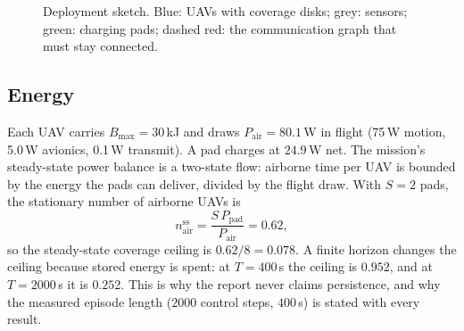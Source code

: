 \documentclass[conference]{IEEEtran}
\begin{document}
\begin{figure}[t]
\centering
{}
\caption{Deployment sketch. Blue: UAVs with coverage disks; grey: sensors; green: charging pads; dashed red: the communication graph that must stay connected.}
\label{fig:setup}
\end{figure}

\subsection{Energy}
Each UAV carries $B_{\max}=30$\,kJ and draws $P_{\mathrm{air}}=80.1$\,W in flight (75\,W motion, 5.0\,W avionics, 0.1\,W transmit). A pad charges at $24.9$\,W net. The mission's steady-state power balance is a two-state flow: airborne time per UAV is bounded by the energy the pads can deliver, divided by the flight draw. With $S=2$ pads, the stationary number of airborne UAVs is
\begin{equation}
n_{\mathrm{air}}^{\mathrm{ss}}=\frac{S\,P_{\mathrm{pad}}}{P_{\mathrm{air}}}=0.62,
\label{eq:ss}
\end{equation}
so the steady-state coverage ceiling is $0.62/8=0.078$. A finite horizon changes the ceiling because stored energy is spent: at $T=400$\,s the ceiling is $0.952$, and at $T=2000$\,s it is $0.252$. This is why the report never claims persistence, and why the measured episode length ($2000$ control steps, $400$\,s) is stated with every result.
\end{document}
